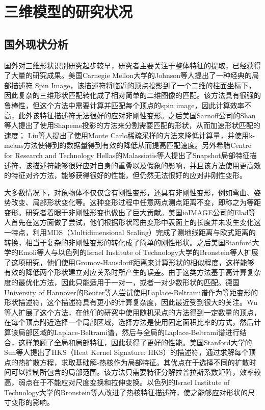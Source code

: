 
\section{三维模型的研究状况}

\subsection{国外现状分析}
国外对三维形状识别研究起步较早，研究者主要关注于整体特征的提取，已经获得了大量的研究成果\cite{Tangelder2008A,Funkhouser2005Shape,Krizhevsky2017ImageNet,Kaick2010A,Ullman1985Three, Loncaric1998A, Campbell2001A}。美国Carnegie Mellon大学的Johnson等人\cite{Johnson2002Using}提出了一种经典的局部描述符 Spin Image，该描述符将临近的顶点投影到了一个二维的柱面坐标下，因此复杂的三维形状匹配转化成了相对简单的二维图像的匹配。该方法具有很强的鲁棒性，但这个方法中需要计算并匹配每个顶点的spin image，因此计算效率不高，此外该特征描述符无法很好的应对非刚性变形。之后美国Sarnoff公司的Shan等人\cite{Shan2006Shapeme}提出了使用Shapeme投影的方法来分割需要匹配的形状，从而加速形状匹配的速度； Liu等人\cite{Liu2006Shape}提出了使用Monte Carlo稀疏采样的方法来降低计算量，并使用k-means方法使得到的数据量得到有效的降低从而提高匹配速度。另外希腊Centre for Research and Technology Hellas的Malassiotis等人\cite{Malassiotis2007Snapshots}提出了Snapshot局部特征描述符，该描述符能够很好应对自身的重叠以及假象的影响，并且该方法使用更高效的特征对齐方法，能够获得很好的性能，但仍然无法很好的应对非刚性变形。

大多数情况下，对象物体不仅仅含有刚性变形，还具有非刚性变形，例如弯曲、姿势改变、局部形状变化等。这种变形过程中任意两点测点距离不变，即称之为等距变形。研究者着眼于非刚性形变也做出了巨大贡献。美国ioIMAGE公司的Elad等人\cite{Elad2001Bending}首先在这方面做了尝试，他们根据形状弯曲变形中表面上的长度并未发生变化这一特点，利用MDS（Multidimensional Scaling）完成了测地线距离与欧式距离的转换，相当于复杂的非刚性变形的转化成了简单的刚性形状。之后美国Stanford大学的Emoli等人\cite{M2005A}与以色列的Israel Institute of Technology大学的Bronstein等人\cite{Bronstein2006Efficient}扩展了这项研究，他们使用Gromov-Hausdorff距离来计算形状的相似程度，这样能够有效的降低两个形状建立对应关系时所产生的误差。由于这类方法基于高计算复杂度的最优化方法，因此只能适用于一对一，或者一对少数形状的匹配。德国University of Hannover的Reuter等人\cite{Reuter2006Laplace}尝试使用Laplace-Beltrami谱作为等距变形的形状描述符，这个描述符具有更小的计算复杂度，因此最近受到很大的关注。Wu等人\cite{Wu2010Global}扩展了这个方法，在他们的研究中使用随机采点的方法得到一定数量的顶点，在每个顶点附近选择一个局部区域，选择方法是使用固定面积比率的方式，然后计算该局部区域的Laplace-Beltrami谱，然后与全局的Laplace-Beltrami谱进行结合，这样兼顾了全局和局部特征，因此获得了更好的性能。美国Stanford大学的Sun等人\cite{Sun2009A}提出了HKS（Heat Kernel Signature: HKS）的描述符，通过求解每个顶点的热扩散方程，求取基础解-热核作为局部特征。其优点在于选择不同的扩散时间可以控制所包含的局部范围。该方法只需要特征分解拉普拉斯系数矩阵，效率较高，弱点在于不能应对尺度变换和拉伸变换。以色列的Israel Institute of Technology大学的Bronstein等人\cite{Bronstein2010Scale}改进了热核特征描述符，使之能够应对形状的尺寸变形的影响。

